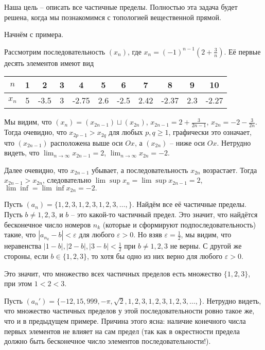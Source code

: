 Наша цель -- описать все частичные пределы. Полностью эта задача будет решена, когда мы познакомимся с топологией вещественной прямой.

Начнём с примера.

\begin{example}
 Рассмотрим последовательность $ (x_n )$, где $x_n = (-1)^{n-1}\left(2 + \frac{3}{n} \right)$. Её первые десять элементов имеют вид
     \begin{center}
      \begin{tabular}{c|c|c|c|c|c|c|c|c|c|c|}
       $n$  & 1& 2 & 3 & 4 & 5 & 6 & 7 & 8 & 9& 10 \\
       \hline
       $x_n$  & 5& -3.5  & 3 & -2.75 & 2.6 & -2.5 & 2.42 & -2.37 & 2.3 & -2.27 
    \end{tabular}     
     \end{center}

 Мы видим, что $ (x_n ) = (x_{2n-1} ) \sqcup (x_{2n} )$, $x_{2n-1} = 2 + \frac{3}{2n-1}$, $x_{2n} = - 2- \frac{3}{2n}$. Тогда очевидно, что $x_{2p-1} > x_{2q}$ для любых $p,q \ge 1$, \ie графически это означает, что $ (x_{2n-1} )$ расположена выше оси $Ox$, а $ (x_{2n} )$ -- ниже оси $Ox$. Нетрудно видеть, что $\lim_{n \to \infty} x_{2n-1} = 2$, $\lim_{n \to \infty} x_{2n} = -2$.
 
 Далее очевидно, что $x_{2n-1}$ убывает, а последовательность $x_{2n}$ возрастает. Тогда $x_{2n-1} > x_{2n}$, следовательно $\lim \sup x_n = \lim \sup x_{2n-1} = 2$, $\lim \inf = \lim \inf x_{2n} = -2.$ 
   
\end{example}

\begin{example}
    Пусть $(a_n) = \{1,2,3,1,2,3,1,2,3,\ldots,\}$. Найдём все её частичные пределы. Пусть $b \ne 1,2,3$, и $b$ -- это какой-то частичный предел. Это значит, что найдётся бесконечное число номеров $n_k$ (которые и сформируют подпоследовательность) такие, что $|a_{n_k} - b| < \varepsilon$ для любого $\varepsilon >0$. Но взяв $\varepsilon = \frac{1}{2}$, мы видим, что неравенства $|1-b|, |2-b|, |3-b| < \frac{1}{2}$ при $b \ne 1,2,3$ не верны. С другой же стороны, если $b \in \{1,2,3\}$, то хотя бы одно из них верно для любого $\varepsilon>0$. 

    Это значит, что множество всех частичных пределов есть множество $\{1,2,3\}$, при этом $1<2<3.$ 
\end{example}

\begin{example}
    Пусть $(a_n' ) = \{-12, 15, 999, -\pi, \sqrt{2}, 1,2,3,1,2,3,1,2,3,\ldots,\}.$ Нетрудно видеть, что множество частичных пределов у этой последовательности ровно такое же, что и в предыдущем примере. Причина этого ясна: наличие конечного числа первых элементов не влияет на сам предел (так как в окрестности предела должно быть бесконечное число элементов последовательности!).
\end{example}

